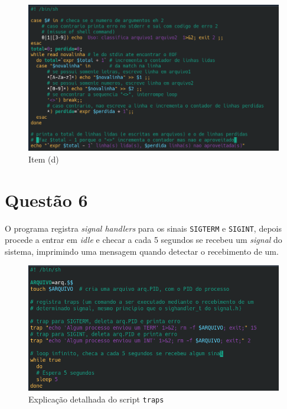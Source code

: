 \documentclass{article}
\begin{document}
\begin{figure}[!ht]
    \begin{center}
        \includegraphics[width=\textwidth]{images/q5_d.png}
        \caption{Item (d)}
    \end{center}
\end{figure}

\section*{Questão 6}

O programa registra \textit{signal handlers} para os sinais \texttt{SIGTERM} e \texttt{SIGINT}, depois procede a entrar em \textit{idle} e checar a cada 5 segundos se recebeu um \textit{signal} do sistema, imprimindo uma mensagem quando detectar o recebimento de um.

\begin{figure}[!ht]
    \begin{center}
        \includegraphics[width=\textwidth]{images/q6_comentario.png}
        \caption{Explicação detalhada do script \texttt{traps}}
    \end{center}
\end{figure}
\end{document}
